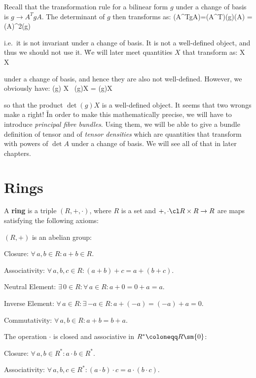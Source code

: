 Recall that the transformation rule for a bilinear form $g$ under a change of basis is $g \to A^T gA$. The determinant
of $g$ then transforms as:
\bse
\det(A^TgA)=\det(A^T)\det(g)\det(A) = (\det A)^2\det(g)
\ese

i.e.\ it is not invariant under a change of basis. It is not a well-defined object, and thus we should not use it. \v

We will later meet quantities $X$ that transform as:
\bse
X \to {} \, X
\ese

under a change of basis, and hence they are also not well-defined. However, we obviously have:
\bse
\det(g) X \to {} \, \det(g)X = \det(g)X
\ese

so that the product $\det(g)X$ is a well-defined object. It seems that two wrongs make a right! \v

In order to make this mathematically precise, we will have to introduce \emph{principal fibre bundles}. Using them,
we will be able to give a bundle definition of tensor and of \emph{tensor densities} which are quantities that
transform with powers of $\det A$ under a change of basis. We will see all of that in later chapters.

\section{Rings}

\bd [Ring]
A \textbf{ring} is a triple $(R,+,\cdot)$, where $R$ is a set and $+,\cdot\cl R\times R\to R$ are maps satisfying the
following axioms:
\bit
\item $(R,+)$ is an abelian group:
\ben
\item[i)] Closure: $\forall \, a,b \in R : a + b \in R$.
\item[ii)] Associativity: $\forall \, a,b,c \in R : (a+b)+c=a+(b+c)$.
\item[iii)] Neutral Element: $\exists \, 0 \in R : \forall \, a \in R : a+0=0+a=a$.
\item[iv)] Inverse Element: $\forall \, a \in R : \exists \, {-a} \in R : a+(-a)=(-a)+a=0$.
\item[v)] Commutativity: $\forall \, a,b \in R : a+b=b+a$.
\een

\item The operation $\cdot$ is closed and associative in $R^* \coloneqq R\sm\{0\}$:
\ben
\item[vi)] Closure: $\forall \, a,b \in R^* : a \cdot b \in R^*$.
\item[vii)] Associativity: $\forall \, a,b,c \in R^* : (a\cdot b)\cdot c=a\cdot (b\cdot c)$.
\een

